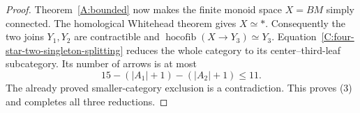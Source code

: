 \begin{proof}
Theorem~\ref{A:bounded} now makes the finite monoid space
$X=BM$ simply connected.  The homological Whitehead theorem
gives $X\simeq *$.  Consequently the two joins $Y_1,Y_2$ are
contractible and
$\operatorname{hocofib}(X\to Y_3)\simeq Y_3$.
Equation~\ref{C:four-star-two-singleton-splitting} reduces the
whole category to its center--third-leaf subcategory.  Its
number of arrows is at most
\[
 15-(|A_1|+1)-(|A_2|+1)\leq11.
\]
The already proved smaller-category exclusion is a contradiction.
This proves (3) and completes all three reductions.
\end{proof}
